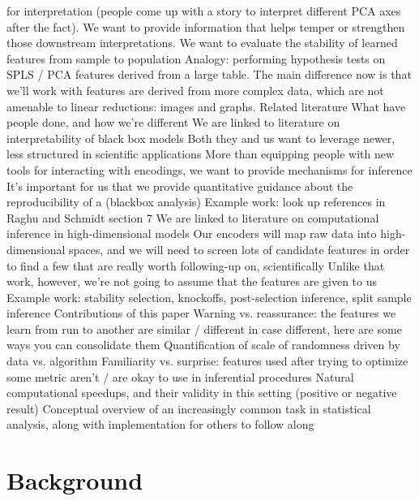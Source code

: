 \documentclass[11pt]{article}
\begin{document}
\begin{outline}
      for interpretation (people come up with a story to interpret different PCA
      axes after the fact). We want to provide information that helps temper or
      strengthen those downstream interpretations.
    \3 We want to evaluate the stability of learned features from sample to
    population
  \2 Analogy: performing hypothesis tests on SPLS / PCA features derived from a
  large table.
    \3 The main difference now is that we'll work with features are derived from
    more complex data, which are not amenable to linear reductions: images and
    graphs.
\1 Related literature
  \2 What have people done, and how we're different
    \3 We are linked to literature on interpretability of black box models
      \4 Both they and us want to leverage newer, less structured in scientific
      applications
      \4 More than equipping people with new tools for interacting with
      encodings, we want to provide mechanisms for inference
      \4 It's important for us that we provide quantitative guidance about the
      reproducibility of a (blackbox analysis)
      \4 Example work: look up references in Raghu and Schmidt section 7
    \3 We are linked to literature on computational inference in
    high-dimensional models
      \4 Our encoders will map raw data into high-dimensional spaces, and we
      will need to screen lots of candidate features in order to find a few that
      are really worth following-up on, scientifically
      \4 Unlike that work, however, we're not going to assume that the features
      are given to us
      \4 Example work: stability selection, knockoffs, post-selection inference,
      split sample inference
\1 Contributions of this paper
  \2 Warning vs. reassurance: the features we learn from run to another are
  similar / different
    \3 in case different, here are some ways you can consolidate them
    \3 Quantification of scale of randomness driven by data vs. algorithm
  \2 Familiarity vs. surprise: features used after trying to optimize some
  metric aren't / are okay to use in inferential procedures
  \2 Natural computational speedups, and their validity in this setting
  (positive or negative result)
  \2 Conceptual overview of an increasingly common task in statistical
  analysis, along with implementation for others to follow along
\end{outline}

\section{Background}
\end{document}
